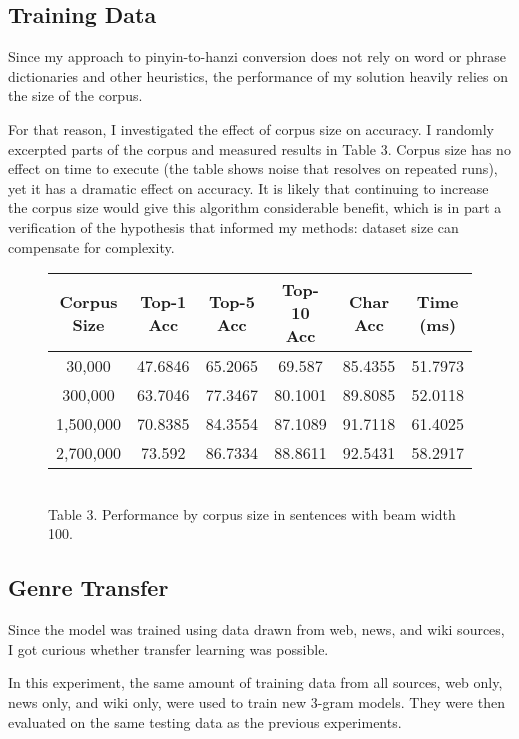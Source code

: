 \documentclass[11pt]{ctexart}
\begin{document}
\subsection{Training Data}

Since my approach to pinyin-to-hanzi conversion does not rely on word or phrase dictionaries and other heuristics, the performance of my solution heavily relies on the size of the corpus. 

For that reason, I investigated the effect of corpus size on accuracy. I randomly excerpted parts of the corpus and measured results in Table 3. Corpus size has no effect on time to execute (the table shows noise that resolves on repeated runs), yet it has a dramatic effect on accuracy. It is likely that
continuing to increase the corpus size would give this algorithm considerable benefit,
which is in part a verification of the hypothesis that informed my methods:
dataset size can compensate for complexity.

\begin{figure}[htp]
\centering

\begin{tabular}{ c|c|c|c|c|c } 
Corpus Size & Top-1 Acc & Top-5 Acc & Top-10 Acc & Char Acc & Time (ms)\\ 
 \hline
30,000 & 47.6846 & 65.2065 & 69.587 & 85.4355 & 51.7973 \\
300,000 & 63.7046 & 77.3467 & 80.1001 & 89.8085 & 52.0118 \\
1,500,000 & 70.8385 & 84.3554 & 87.1089 & 91.7118 & 61.4025 \\
2,700,000 & 73.592 & 86.7334 & 88.8611 & 92.5431 & 58.2917 \\

\end{tabular}
\\
\vspace{5mm}
Table 3. Performance by corpus size in sentences with beam width 100.

\end{figure}

\subsection{Genre Transfer}

Since the model was trained using data drawn from web, news, and wiki sources, I got curious
whether transfer learning was possible.

In this experiment, the same amount of training data from all sources, web only, news only, and wiki only, were used to train new 3-gram models. They were then evaluated on the same testing data as the previous experiments.
\end{document}
